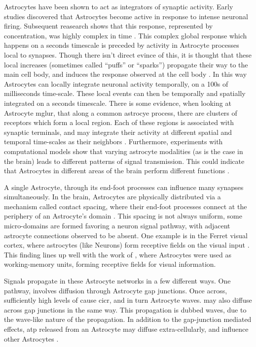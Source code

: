     Astrocytes have been shown to act as integrators of synaptic activity. Early
    studies discovered that Astrocytes become active in response to intense
    neuronal firing. Subsequent reasearch shows that this response, represented
    by \ca concentration, was highly complex in time
    \cite{araque_2014}. This complex global response which happens on a seconds
    timescale is preceded by \ca activity in Astrocyte processes local to
    synapses. Though there isn't direct evince of this, it is thought that these
    local \ca increases (sometimes called ``puffs'' or ``sparks'') propagate
    their way to the main cell body, and induces the response observed at the
    cell body \cite{araque_2014}. In this way Astrocytes can locally integrate
    neuronal activity temporally, on a 100s of milliseconds time-scale. These
    local events can then be temporally and spatially integrated on a seconds
    timescale. There is some evidence, when looking at Astrocyte \Gls{mglur},
    that along a common astrocye process, there are clusters of
    receptors which form a local region. Each of these regions is associated
    with synaptic terminals, and may integrate their activity at different
    spatial and temporal time-scales as their neighbors
    \cite{pitta_2012}. Furthermore, experiments with computational models show
    that varying astrocyte modalities (as is the case in the brain) leads to
    different patterns of signal transmission. This could indicate that
    Astrocytes in different areas of the brain perform different functions
    \cite{pitta_2012}.

    A single Astrocyte, through its end-foot processes can influence many
    synapses simultaneously. In the brain, Astrocytes are physically distributed
    via a mechanism called contact spacing, where their end-foot processes
    connect at the periphery of an Astrocyte's domain \cite{pitta_2012}. This
    spacing is not always uniform, some micro-domains are formed favoring a
    neuron signal pathway, with adjacent astrocyte connections observed to be
    absent. One example is in the Ferret visual cortex, where astrocytes (like
    Neurons) form receptive fields on the visual input \cite{pitta_2012}. This
    finding lines up well with the work of \parencite{gordleeva_2021}, where
    Astrocytes were used as working-memory units, forming receptive fields for
    visual information.

    Signals propagate in these Astrocyte networks in a few different
    ways. One pathway, involves \ipt diffusion through Astrocyte gap junctions. Once across, sufficiently high levels of \ipt cause
    \Gls{cicr}, and in turn Astrocyte waves. \ca may also diffuse across gap
    junctions in the same way. This propagation is dubbed \ca waves, due to
    the wave-like nature of the propagation. In addition to the gap-junction
    mediated effects, \gls{atp} released from an Astrocyte may diffuse
    extra-cellularly, and influence other Astrocytes \cite{amiri_2013}.
    
